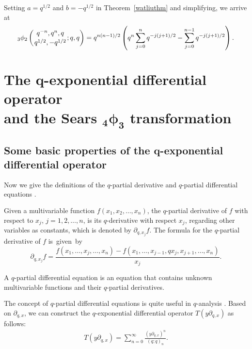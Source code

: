 \documentclass[pdftex]{sigma}
\numberwithin{equation}{section}
\begin{document}
Setting $a=q^{1/2}$ and $b=-q^{1/2}$ in Theorem~\ref{watliuthm} and simplifying, we arrive at \cite[equation~(5.3)]{Andrews2012}%
\begin{equation*}%
	{_3\phi_2}\left({{q^{-n}, q^{n}, q }\atop{q^{1/2}, -q^{1/2}}}; q, q\right)
	= q^{n(n-1)/2}\left(q^n \sum_{j=0}^n q^{-j(j+1)/2}
	-\sum_{j=0}^{n-1} q^{-j(j+1)/2}\right).
\end{equation*}


\section[The q-exponential differential operator and the Sears \_4phi\_3 transformation]{The $\boldsymbol{q}$-exponential differential operator\\ and the Sears $\boldsymbol{_4\phi_3}$ transformation}\label{sec3}

\subsection[Some basic properties of the q-exponential differential operator]{Some basic properties of the $\boldsymbol{q}$-exponential differential operator}

Now we give the definitions of the $q$-partial derivative and $q$-partial differential equations \cite{LiuHahn2015}.
{ \begin{Definition}%
Given a multivariable function $f(x_1, x_2, \dots, x_n)$, the $q$-partial derivative of $f$ with respect to $x_j$, $j=1, 2, \ldots, n$, is its $q$-derivative with respect
$x_j$, regarding other variables as constants, which is denoted by
 $\partial_{q, x_j}f$. The formula for the $q$-partial derivative of $f$ is~given~by
\begin{equation*}
\partial_{q, x_j}f=\frac{f(x_1, \ldots, x_{j}, \ldots, x_n)-f(x_1, \ldots, x_{j-1}, qx_{j}, x_{j+1}, \ldots, x_n)}{x_j}.
\end{equation*}
\end{Definition}}
\begin{Definition}%
A $q$-partial differential equation is an equation that contains unknown multivariable functions and their $q$-partial derivatives.
\end{Definition}
	
The concept of $q$-partial differential equations is quite useful in $q$-analysis \cite{AslanIsmail, LiuRam2013, LiuHahn2015, Liu2017}.
Based on $\partial_{q, x}$, we can construct the $q$-exponential differential operator $T(y\partial_{q, x})$ as follows:
\begin{align*}%
	T(y\partial_{q, x})=\sum_{n=0}^\infty \frac{(y \partial_{q, x})^n}{(q; q)_n}.
\end{align*}
\end{document}
